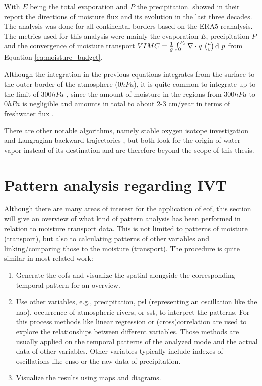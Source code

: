With $E$ being the total evaporation and $P$ the precipitation. 
\citeauthor{yang_moisture_2022} showed in their report \cite{yang_moisture_2022} the directions of moisture flux and its evolution in the last three decades. The analysis was done for all continental borders based on the ERA5 reanalysis.
The metrics used for this analysis were mainly the evaporation $E$, precipitation $P$ and the convergence of moisture transport $VIMC = \frac{1}{g} \int^{P_s}_0  \nabla \cdot q ~\binom{u}{v} \operatorname{d}\!{~} p$ from Equation \ref{eq:moisture_budget}.

Although the integration in the previous equations integrates from the surface to the outer border of the atmosphere ($0 hPa$), it is quite common to integrate up to the limit of $300 hPa$ \cite{ayantobo_integrated_2022, zhu_proposed_1998, kim_ensos_2015, guirguis_circulation_2018}, since the amount of moisture in the regions from $300 hPa$ to $0 hPa$ is negligible and amounts in total to about 2-3 cm/year in terms of freshwater flux \cite{zhou_atmospheric_2005}.

There are other notable algorithms, namely stable oxygen isotope investigation \cite{ma_atmospheric_2018} and Langragian backward trajectories \cite{zhao_lagrangian_2021}, but both look for the origin of water vapor instead of its destination and are therefore beyond the scope of this thesis.



\section{Pattern analysis regarding IVT}
\label{sec:related_pattern_analysis}





Although there are many areas of interest for the application of \ac{eof}, this section will give an overview of what kind of pattern analysis has been performed in relation to moisture transport data.
This is not limited to patterns of moisture (transport), but also to calculating patterns of other variables and linking/comparing those to the moisture (transport). 
The procedure is quite similar in most related work: 

\begin{enumerate}[noitemsep]
  \item Generate the \acp{eof} and  visualize the spatial alongside the corresponding temporal pattern for an overview. 
  \item Use other variables, e.g., precipitation, \ac{psl} (representing an oscillation like the \ac{nao}), occurrence of atmospheric rivers, or \ac{sst}, to interpret the patterns. For this process methods like linear regression or (cross)correlation are used to explore the relationships between different variables. Those methods are usually applied on the temporal patterns of the analyzed mode and the actual data of other variables. Other variables typically include indexes of oscillations like \ac{enso} \cite{ayantobo_integrated_2022, kim_ensos_2015} or the raw data of precipitation. 
  \item Visualize the results using maps and diagrams. 
\end{enumerate}

